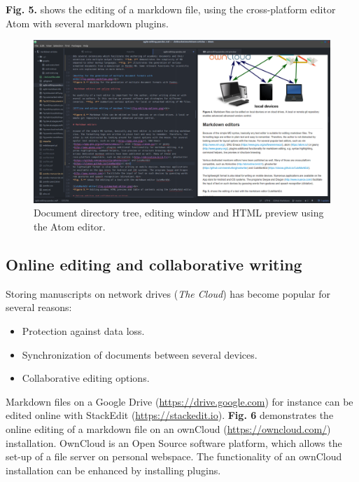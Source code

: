 \documentclass[10pt,fleqn]{wlpeerj}
\providecommand{\tightlist}{%
  \setlength{\itemsep}{0pt}\setlength{\parskip}{0pt}}
\begin{document}
\textbf{Fig. 5.} shows the editing of a markdown file, using the
cross-platform editor Atom with several markdown plugins.

\begin{figure}[htbp]
\centering
\includegraphics{Fig5.png}
\caption{Document directory tree, editing window and HTML preview using
the Atom editor.}
\end{figure}

\subsection{Online editing and collaborative
writing}\label{online-editing-and-collaborative-writing}

Storing manuscripts on network drives (\emph{The Cloud}) has become
popular for several reasons:

\begin{itemize}
\tightlist
\item
  Protection against data loss.
\item
  Synchronization of documents between several devices.
\item
  Collaborative editing options.
\end{itemize}

Markdown files on a Google Drive (\url{https://drive.google.com}) for
instance can be edited online with StackEdit
(\url{https://stackedit.io}). \textbf{Fig. 6} demonstrates the online
editing of a markdown file on an ownCloud (\url{https://owncloud.com/})
installation. OwnCloud is an Open Source software platform, which allows
the set-up of a file server on personal webspace. The functionality of
an ownCloud installation can be enhanced by installing plugins.
\end{document}
